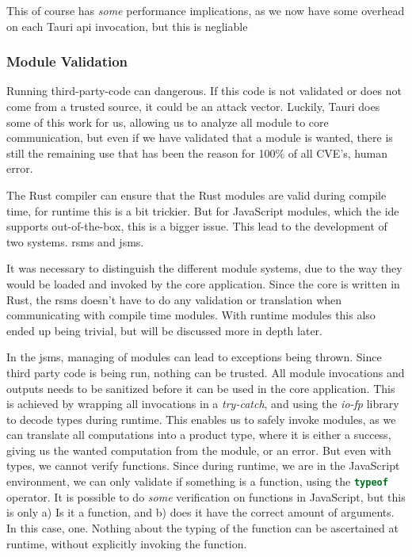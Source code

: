 This of course has \textit{some} performance implications, as we now have some overhead on
each Tauri \gls*{api} invocation, but this is negliable\footnotemark{}


\subsubsection{Module Validation}

Running third-party-code can dangerous. If this code is not validated or does
not come from a trusted source, it could be an attack vector. Luckily, Tauri does
some of this work for us, allowing us to analyze all module to core
communication, but even if we have validated that a module is wanted, there is
still the remaining use that has been the reason for 100\% of all CVE's, human
error.

The Rust compiler can ensure that the Rust modules are valid during compile
time, for runtime this is a bit trickier. But for JavaScript modules, which the
\gls*{ide} supports out-of-the-box, this is a bigger issue. This lead to the
development of two systems. \gls*{rsms} and \gls*{jsms}.

It was necessary to distinguish the different module systems, due to the way
they would be loaded and invoked by the core application. Since the core is
written in Rust, the \gls*{rsms} doesn't have to do any validation or
translation when communicating with compile time modules. With runtime modules
this also ended up being trivial, but will be discussed more in depth later.

In the \gls*{jsms}, managing of modules can lead to exceptions being thrown.
Since third party code is being run, nothing can be trusted. All module
invocations and outputs needs to be sanitized before it can be used in the core
application. This is achieved by wrapping all invocations in a
\textit{try-catch}, and using the \textit{io-fp} library to decode types during
runtime. This enables us to safely invoke modules, as we can translate all
computations into a product type, where it is either a success, giving us the
wanted computation from the module, or an error. But even with types, we cannot
verify functions. Since during runtime, we are in the JavaScript environment,
we can only validate if something is a function, using the
\lstinline[language=JavaScript]{typeof} operator. It is possible to do
\textit{some} verification on functions in JavaScript, but this is only a) Is it
a function, and b) does it have the correct amount of arguments. In this case,
one. Nothing about the typing of the function can be ascertained at runtime,
without explicitly invoking the function.

